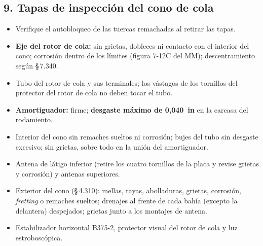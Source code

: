 \subsection*{9. Tapas de inspección del cono de cola}
\begin{itemize}
\item Verifique el autobloqueo de las tuercas remachadas al retirar las tapas.
\item \textbf{Eje del rotor de cola:} sin grietas, dobleces ni contacto con el interior del cono; corrosión dentro de los límites (figura 7-12C del MM); descentramiento según \S\,7.340.
\item Tubo del rotor de cola y sus terminales; los vástagos de los tornillos del protector del rotor de cola no deben tocar el tubo.
\item \textbf{Amortiguador:} firme; \textbf{desgaste máximo de 0,040~in} en la carcasa del rodamiento.
\item Interior del cono sin remaches sueltos ni corrosión; bujes del tubo sin desgaste excesivo; sin grietas, sobre todo en la unión del amortiguador.
\item Antena de látigo inferior (retire los cuatro tornillos de la placa y revise grietas y corrosión) y antenas superiores.
\item Exterior del cono (\S\,4.310): mellas, rayas, abolladuras, grietas, corrosión, \emph{fretting} o remaches sueltos; drenajes al frente de cada bahía (excepto la delantera) despejados; grietas junto a los montajes de antena.
\item Estabilizador horizontal B375-2, protector visual del rotor de cola y luz estroboscópica.
\end{itemize}


